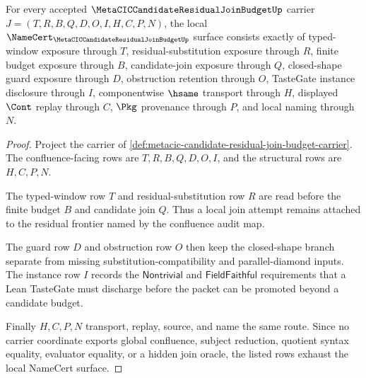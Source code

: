 \begin{theorem}
\label{thm:metacic-candidate-residual-join-budget-namecert-obligations}
For every accepted $\MetaCICCandidateResidualJoinBudgetUp$ carrier $J=(T,R,B,Q,D,O,I,H,C,P,N)$, the local $\NameCert_{\MetaCICCandidateResidualJoinBudgetUp}$ surface consists exactly of typed-window exposure through $T$, residual-substitution exposure through $R$, finite budget exposure through $B$, candidate-join exposure through $Q$, closed-shape guard exposure through $D$, obstruction retention through $O$, TasteGate instance disclosure through $I$, componentwise $\hsame$ transport through $H$, displayed $\Cont$ replay through $C$, $\Pkg$ provenance through $P$, and local naming through $N$.
\end{theorem}
\begin{proof}
Project the carrier of \autoref{def:metacic-candidate-residual-join-budget-carrier}. The confluence-facing rows are $T,R,B,Q,D,O,I$, and the structural rows are $H,C,P,N$.

The typed-window row $T$ and residual-substitution row $R$ are read before the finite budget $B$ and candidate join $Q$. Thus a local join attempt remains attached to the residual frontier named by the confluence audit map.

The guard row $D$ and obstruction row $O$ then keep the closed-shape branch separate from missing substitution-compatibility and parallel-diamond inputs. The instance row $I$ records the $\mathsf{Nontrivial}$ and $\mathsf{FieldFaithful}$ requirements that a Lean TasteGate must discharge before the packet can be promoted beyond a candidate budget.

Finally $H,C,P,N$ transport, replay, source, and name the same route. Since no carrier coordinate exports global confluence, subject reduction, quotient syntax equality, evaluator equality, or a hidden join oracle, the listed rows exhaust the local NameCert surface.
\end{proof}

